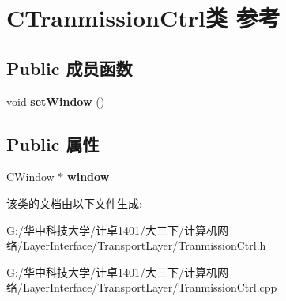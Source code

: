 \hypertarget{class_c_tranmission_ctrl}{}\section{C\+Tranmission\+Ctrl类 参考}
\label{class_c_tranmission_ctrl}
\subsection*{Public 成员函数}
\begin{DoxyCompactItemize}
\item 
\mbox{\label{class_c_tranmission_ctrl_a788cf64847e7345d6f82080a539431eb}} 
void {\bfseries set\+Window} ()
\end{DoxyCompactItemize}
\subsection*{Public 属性}
\begin{DoxyCompactItemize}
\item 
\mbox{\label{class_c_tranmission_ctrl_a78277227cfa57679025eaffe98b3807c}} 
\hyperlink{class_c_window}{C\+Window} $\ast$ {\bfseries window}
\end{DoxyCompactItemize}


该类的文档由以下文件生成\+:\begin{DoxyCompactItemize}
\item 
G\+:/华中科技大学/计卓1401/大三下/计算机网络/\+Layer\+Interface/\+Transport\+Layer/Tranmission\+Ctrl.\+h\item 
G\+:/华中科技大学/计卓1401/大三下/计算机网络/\+Layer\+Interface/\+Transport\+Layer/Tranmission\+Ctrl.\+cpp\end{DoxyCompactItemize}
